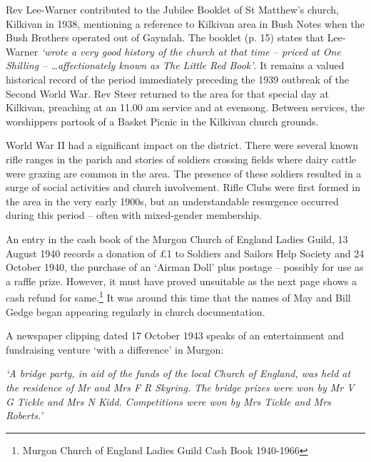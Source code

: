 Rev Lee-Warner contributed to the Jubilee Booklet of St Matthew's church, Kilkivan in 1938, mentioning a reference to Kilkivan area in Bush Notes when the Bush Brothers operated out of Gayndah. The booklet (p. 15) states that Lee-Warner \emph{`wrote a very good history of the church at that time -- priced at One Shilling -- \ldots affectionately known as The Little Red Book'}. It remains a valued historical record of the period immediately preceding the 1939 outbreak of the Second World War. Rev Steer returned to the area for that special day at Kilkivan, preaching at an 11.00 am service and at evensong. Between services, the worshippers partook of a Basket Picnic in the Kilkivan church grounds.



World War II had a significant impact on the district. There were several known rifle ranges in the parish and stories of soldiers crossing fields where dairy cattle were grazing are common in the area. The presence of these soldiers resulted in a surge of social activities and church involvement. Rifle Clubs were first formed in the area in the very early 1900s, but an understandable resurgence occurred during this period -- often with mixed-gender membership.



An entry in the cash book of the Murgon Church of England Ladies Guild, 13 August 1940 records a donation of \pounds1 to Soldiers and Sailors Help Society and 24 October 1940, the purchase of an `Airman Doll' plus postage -- possibly for use as a raffle prize. However, it must have proved unsuitable as the next page shows a cash refund for same.\footnote{Murgon Church of England Ladies Guild Cash Book 1940-1966} It was around this time that the names of May and Bill Gedge began appearing regularly in church documentation.


A newspaper clipping dated 17 October 1943 speaks of an entertainment and fundraising venture `with a difference' in Murgon:



\emph{`A bridge party, in aid of the funds of the local Church of England, was held at the residence of Mr and Mrs F R Skyring. The bridge prizes were won by Mr V G Tickle and Mrs N Kidd. Competitions were won by Mrs Tickle and Mrs Roberts.'}



\smallskip



